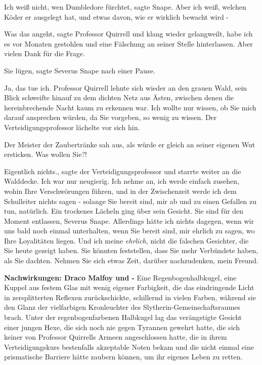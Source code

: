 \glqq{}Ich weiß nicht, wen Dumbledore fürchtet\grqq{}, sagte Snape. \glqq{}Aber
ich weiß, welchen Köder er ausgelegt hat, und etwas davon, wie er wirklich
bewacht wird -\grqq{}

\glqq{}Was das angeht\grqq{}, sagte Professor Quirrell und klang wieder
gelangweilt, \glqq{}habe ich es vor Monaten gestohlen und eine Fälschung an
seiner Stelle hinterlassen. Aber vielen Dank für die Frage.\grqq{}

\glqq{}Sie lügen\grqq{}, sagte Severus Snape nach einer Pause.

\glqq{}Ja, das tue ich.\grqq{} Professor Quirrell lehnte sich wieder an den
grauen Wald, sein Blick schweifte hinauf zu dem dichten Netz aus Ästen, zwischen
denen die hereinbrechende Nacht kaum zu erkennen war. \glqq{}Ich wollte nur
wissen, ob Sie mich darauf ansprechen würden, da Sie vorgeben, so wenig zu
wissen.\grqq{} Der Verteidigungsprofessor lächelte vor sich hin.

Der Meister der Zaubertränke sah aus, als würde er gleich an seiner eigenen Wut
ersticken. \glqq{}Was wollen Sie?!\grqq{}

\glqq{}Eigentlich nichts.\grqq{}, sagte der Verteidigungsprofessor und starrte
weiter an die Walddecke. \glqq{}Ich war nur neugierig. Ich nehme an, ich werde
einfach zusehen, wohin Ihre Verschwörungen führen, und in der Zwischenzeit werde
ich dem Schulleiter nichts sagen - solange Sie bereit sind, mir ab und zu einen
Gefallen zu tun, natürlich.\grqq{} Ein trockenes Lächeln ging über sein Gesicht.
\glqq{}Sie sind für den Moment entlassen, Severus Snape. Allerdings hätte ich
nichts dagegen, wenn wir uns bald noch einmal unterhalten, wenn Sie bereit sind,
mir ehrlich zu sagen, wo Ihre Loyalitäten liegen. Und ich meine \emph{ehrlich},
nicht die falschen Gesichter, die Sie heute gezeigt haben. Sie könnten
feststellen, dass Sie mehr Verbündete haben, als Sie dachten. Nehmen Sie sich
etwas Zeit, darüber nachzudenken, mein Freund.\grqq{}

\textbf{Nachwirkungen: Draco Malfoy und -}
Eine Regenbogenhalbkugel, eine Kuppel aus festem Glas mit wenig eigener
Farbigkeit, die das eindringende Licht in zersplitterten Reflexen
zurückschickte, schillernd in vielen Farben, während sie den Glanz der
vielfarbigen Kronleuchter des Slytherin-Gemeinschaftsraumes brach. Unter der
regenbogenfarbenen Halbkugel lag das verängstigte Gesicht einer jungen Hexe, die
sich noch nie gegen Tyrannen gewehrt hatte, die sich keiner von Professor
Quirrells Armeen angeschlossen hatte, die in ihrem Verteidigungskurs bestenfalls
akzeptable Noten bekam und die nicht einmal eine prismatische Barriere hätte
zaubern können, um ihr eigenes Leben zu retten.

